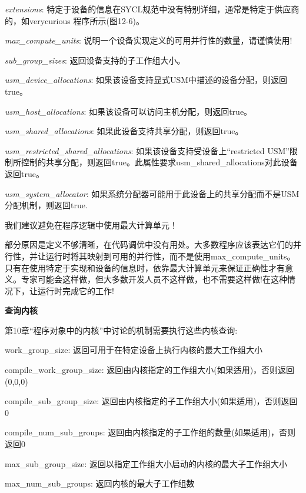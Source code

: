\textit{extensions}: 特定于设备的信息在SYCL规范中没有特别详细，通常是特定于供应商的，如verycurious 程序所示(图12-6)。\par

\textit{max\_compute\_units}: 说明一个设备实现定义的可用并行性的数量，请谨慎使用!\par

\textit{sub\_group\_sizes}: 返回设备支持的子工作组大小。\par

\textit{usm\_device\_allocations}: 如果该设备支持显式USM中描述的设备分配，则返回true。\par

\textit{usm\_host\_allocations}: 如果该设备可以访问主机分配，则返回true。\par

\textit{usm\_shared\_allocations}: 如果此设备支持共享分配，则返回true。\par

\textit{usm\_restricted\_shared\_allocations}: 如果该设备支持受设备上“restricted USM”限制所控制的共享分配，则返回true。此属性要求usm\_shared\_allocations对此设备返回true。\par

\textit{usm\_system\_allocator}: 如果系统分配器可能用于此设备上的共享分配而不是USM分配机制，则返回true.\par

\begin{tcolorbox}[colback=red!5!white,colframe=red!75!black]
我们建议避免在程序逻辑中使用最大计算单元！
\end{tcolorbox}

部分原因是定义不够清晰，在代码调优中没有用处。大多数程序应该表达它们的并行性，并让运行时将其映射到可用的并行性，而不是使用max\_compute\_units。只有在使用特定于实现和设备的信息时，依靠最大计算单元来保证正确性才有意义。专家可能会这样做，但大多数开发人员不这样做，也不需要这样做!在这种情况下，让运行时完成它的工作!\par

\hspace*{\fill} \par %
\textbf{查询内核}

第10章“程序对象中的内核”中讨论的机制需要执行这些内核查询:\par

work\_group\_size: 返回可用于在特定设备上执行内核的最大工作组大小\par

compile\_work\_group\_size: 返回由内核指定的工作组大小(如果适用)，否则返回(0,0,0)\par

compile\_sub\_group\_size: 返回由内核指定的子工作组大小(如果适用)，否则返回0\par

compile\_num\_sub\_groups: 返回由内核指定的子工作组的数量(如果适用)，否则返回0\par

max\_sub\_group\_size: 返回以指定工作组大小启动的内核的最大子工作组大小\par

max\_num\_sub\_groups: 返回内核的最大子工作组数\par











